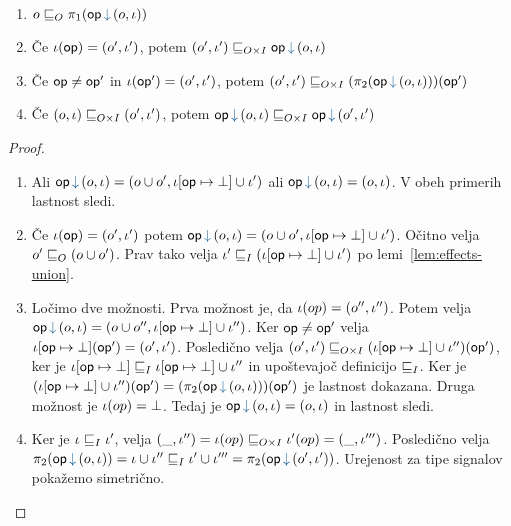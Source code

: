 \begin{lema}\label{lem:effects-order}
	\begin{enumerate}
		\item\label{lem:eo-1} $o \order{O} \pi_1 (\opincomp{op}{(\o, \i)})$
		\item\label{lem:eo-3} Če $\iota(\mathsf{op}) = (o', \iota')$, potem $(\o', \i') \order{O \times I} \opincomp{\op}{(\o, \i)}$
		\item\label{lem:eo-4} Če $\mathsf{op} \neq \mathsf{op}'$ in $\iota(\mathsf{op}') = (o', \iota')$, potem $(\o', \i') \order{O \times I} (\pi_2(\opincomp{\op}{(\o, \i)}))(\op')$
		\item\label{lem:eo-5} Če $(o, \iota) \sqsubseteq_{O \times I} (o', \iota')$, potem $\opincomp{op}{(\o, \i)} \order{O \times I} \opincomp{op}{(\o', \i')}$
	\end{enumerate}
\end{lema}

\begin{proof}
	\begin{enumerate}
		\item Ali $\opincomp{op}{(\o, \i)} = (\o \cup \o' , \i[\op \mapsto \bot] \cup \i')$ ali $\opincomp{op}{(\o, \i)} = (\o, \i)$. V obeh primerih lastnost sledi.
		\item Če $\iota(\mathsf{op}) = (o', \iota')$ potem $\opincomp{op}{(\o, \i)} = (\o \cup \o' , \i[\op \mapsto \bot] \cup \i')$. Očitno velja $o' \sqsubseteq_{O} (o \cup o')$.
		Prav tako velja $\iota' \sqsubseteq_{I} (\iota[\mathsf{op} \mapsto \bot] \cup \iota')$ po lemi~\ref{lem:effects-union}.
		\item Ločimo dve možnosti.
		Prva možnost je, da $\iota(op) = (o'', \iota'')$. Potem velja $\opincomp{\op}{(\o, \i)} = (\o \cup \o'' , \i[\op \mapsto \bot] \cup \i'')$.
		Ker $\mathsf{op} \neq \mathsf{op}'$ velja $\iota[\mathsf{op} \mapsto \bot](\mathsf{op}') = (o', \iota')$.
		Posledično velja $(o', \iota') \sqsubseteq_{O \times I} (\iota[\mathsf{op} \mapsto \bot] \cup \iota'')(\mathsf{op}')$, ker je $\iota[\mathsf{op} \mapsto \bot] \sqsubseteq_{I} \iota[\mathsf{op} \mapsto \bot] \cup \iota''$ in upoštevajoč definicijo $\sqsubseteq_{I}$. Ker je $(\i[\op \mapsto \bot] \cup \i'')(\op') = (\pi_2(\opincomp{\op}{(\o, \i)}))(\op')$ je lastnost dokazana.
		Druga možnost je $\iota(op) = \bot$. Tedaj je $\opincomp{op}{(\o, \i)} = (\o, \i)$ in lastnost sledi. 
		\item Ker je $\iota \sqsubseteq_{I} \iota'$, velja $(\_, \iota'') = \iota(op) \sqsubseteq_{O \times I} \iota'(op) = (\_, \iota''')$. Posledično velja $\pi_2(\opincomp{op}{(\o, \i)}) = \i \cup \i'' \order{I} \i' \cup \i''' = \pi_2(\opincomp{op}{(\o', \i')})$.
		Urejenost za tipe signalov pokažemo simetrično.
	\end{enumerate}
\end{proof}

